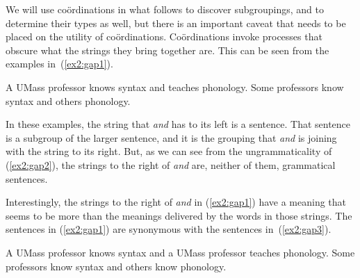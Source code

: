 We will use co\"ordinations in what follows to discover subgroupings, and to determine their types as well, but there is an important caveat that needs to be placed on the utility of co\"ordinations. Co\"ordinations invoke processes that obscure what the strings they bring together are. This can be seen from the examples in~(\ref{ex2:gap1}).
\begin{exe}
	\raggedright
	\ex \label{ex2:gap1} 
	\begin{xlist}
		\ex A UMass professor knows syntax and teaches phonology.
		\ex Some professors know syntax and others phonology.
	\end{xlist}
\end{exe}
In these examples, the string that \emph{and} has to its left is a sentence. That sentence is a subgroup of the larger sentence, and it is the grouping that \emph{and} is joining with the string to its right. But, as we can see from the ungrammaticality of (\ref{ex2:gap2}), the strings to the right of \emph{and} are, neither of them, grammatical sentences.
\pagebreak
\begin{exe}
	\raggedright
	\ex \label{ex2:gap2} 
	\begin{xlist}
		\ex[*]{Teaches phonology.}
		\ex[*]{Others phonology.}
	\end{xlist}
\end{exe}
Interestingly, the strings to the right of \emph{and} in (\ref{ex2:gap1}) have a meaning that seems to be more than the meanings delivered by the words in those strings. The sentences in (\ref{ex2:gap1}) are synonymous with the sentences in~(\ref{ex2:gap3}).
\begin{exe}
	\raggedright
	\ex \label{ex2:gap3} 
	\begin{xlist}
		\ex A UMass professor knows syntax and a UMass professor teaches phonology.
		\ex Some professors know syntax and others know phonology.
	\end{xlist}%
%
%
%
\end{exe}
